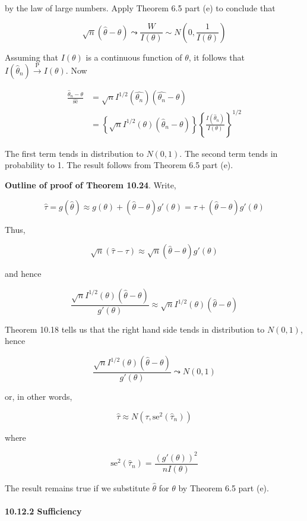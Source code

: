 by the law of large numbers. Apply Theorem 6.5 part (e) to conclude that

\[\sqrt{n}(\hat{\theta} - \theta) \leadsto \frac{W}{I(\theta)} \sim N \left(0, \frac{1}{I(\theta)} \right)\]

Assuming that \(I(\theta)\) is a continuous function of \(\theta\), it
follows that \(I(\hat{\theta}_n) \xrightarrow{\text{P}} I(\theta)\). Now

\begin{align}
\frac{\hat{\theta}_n - \theta}{\hat{\text{se}}}&= \sqrt{n} I^{1/2}(\hat{\theta_n})(\hat{\theta_n} - \theta) \\
&= \left\{ \sqrt{n} I^{1/2}(\theta)(\hat{\theta}_n - \theta)\right\} \left\{ \frac{I(\hat{\theta}_n)}{I(\theta)} \right\}^{1/2}
\end{align}

The first term tends in distribution to \(N(0, 1)\). The second term
tends in probability to 1. The result follows from Theorem 6.5 part (e).

\textbf{Outline of proof of Theorem 10.24}. Write,

\[\hat{\tau} = g(\hat{\theta}) \approx g(\theta) + (\hat{\theta} - \theta)g'(\theta) = \tau + (\hat{\theta} - \theta)g'(\theta)\]

Thus,

\[\sqrt{n}(\hat{\tau} - \tau) \approx \sqrt{n}(\hat{\theta} - \theta)g'(\theta)\]

and hence

\[\frac{\sqrt{n}I^{1/2}(\theta)(\hat{\theta} - \theta)}{g'(\theta)} \approx \sqrt{n}I^{1/2}(\theta)(\hat{\theta} - \theta)\]

Theorem 10.18 tells us that the right hand side tends in distribution to
\(N(0, 1)\), hence

\[\frac{\sqrt{n}I^{1/2}(\theta)(\hat{\theta} - \theta)}{g'(\theta)} \leadsto N(0, 1)\]

or, in other words,

\[\hat{\tau} \approx N(\tau, \text{se}^2(\hat{\tau}_n))\]

where

\[\text{se}^2(\hat{\tau}_n) = \frac{(g'(\theta))^2}{nI(\theta)}\]

The result remains true if we substitute \(\hat{\theta}\) for \(\theta\)
by Theorem 6.5 part (e).

\paragraph{10.12.2 Sufficiency}\label{sufficiency}

